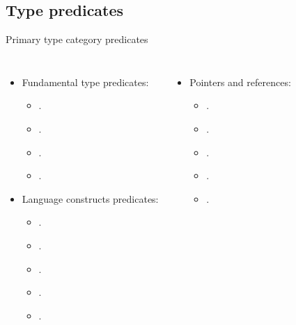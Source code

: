 \subsection{Type predicates}

\begin{frame}[t,fragile]{Primary type category predicates}
\begin{columns}[T]

\begin{itemize}
  \item Fundamental type predicates:
    \begin{itemize}
      \item {}.
      \item {}.
      \item {}.
      \item {}.
    \end{itemize}

  \item Language constructs predicates:
    \begin{itemize}
      \item {}.
      \item {}.
      \item {}.
      \item {}.
      \item {}.
    \end{itemize}
\end{itemize}

\begin{itemize}
  \item Pointers and references:
    \begin{itemize}
      \item {}.
      \item {}.
      \item {}.
      \item {}.
      \item {}.
    \end{itemize}
\end{itemize}
\end{columns}
\end{frame}

